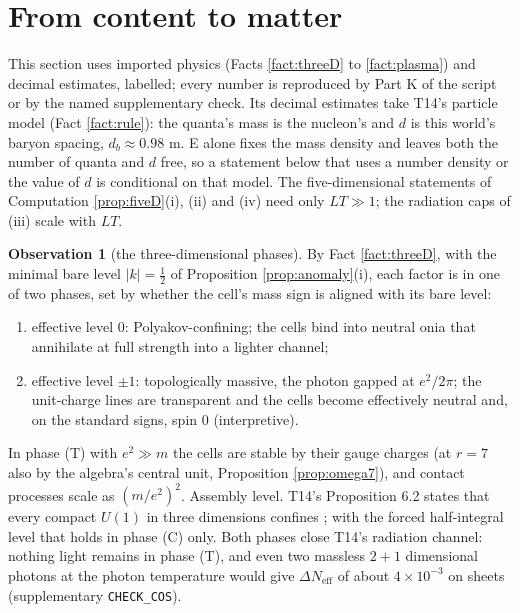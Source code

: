 \documentclass[11pt]{article}
\theoremstyle{definition}
\newtheorem{observation}[theorem]{Observation}
\newcommand{\Neff}{N_{\mathrm{eff}}}
\newcommand{\file}[1]{\texttt{#1}}
\begin{document}
\section{From content to matter}\label{sec:matter}

This section uses imported physics (Facts \ref{fact:threeD} to \ref{fact:plasma}) and decimal estimates, labelled; every number is reproduced by Part K of the script or by the named supplementary check. Its decimal estimates take T14's particle model (Fact \ref{fact:rule}): the quanta's mass is the nucleon's and $d$ is this world's baryon spacing, $d_{b} \approx 0.98$ m. E alone fixes the mass density and leaves both the number of quanta and $d$ free, so a statement below that uses a number density or the value of $d$ is conditional on that model. The five-dimensional statements of Computation \ref{prop:fiveD}(i), (ii) and (iv) need only $LT \gg 1$; the radiation caps of (iii) scale with $LT$.

\begin{observation}[the three-dimensional phases]\label{prop:phases}
By Fact \ref{fact:threeD}, with the minimal bare level $|k| = \tfrac{1}{2}$ of Proposition \ref{prop:anomaly}(i), each factor is in one of two phases, set by whether the cell's mass sign is aligned with its bare level:
\begin{enumerate}
\item[(C)] effective level $0$: Polyakov-confining; the cells bind into neutral onia that annihilate at full strength into a lighter channel;
\item[(T)] effective level $\pm 1$: topologically massive, the photon gapped at $e^{2}/2\pi$; the unit-charge lines are transparent and the cells become effectively neutral and, on the standard signs, spin $0$ (interpretive).
\end{enumerate}
In phase (T) with $e^{2} \gg m$ the cells are stable by their gauge charges (at $r = 7$ also by the algebra's central unit, Proposition \ref{prop:omega7}), and contact processes scale as $(m/e^{2})^{2}$. Assembly level. T14's Proposition 6.2 states that every compact $U(1)$ in three dimensions confines \cite[Prop.~6.2]{ButlerT14}; with the forced half-integral level that holds in phase (C) only. Both phases close T14's radiation channel: nothing light remains in phase (T), and even two massless $2+1$ dimensional photons at the photon temperature would give $\Delta\Neff$ of about $4 \times 10^{-3}$ on sheets (supplementary \file{CHECK\_COS}).
\end{observation}
\end{document}
